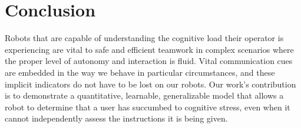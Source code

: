 \documentclass{sig-alternate}
\begin{document}



\section{Conclusion}

Robots that are capable of understanding the cognitive load their operator is experiencing are vital to safe and
efficient teamwork in complex scenarios where the proper level of autonomy and interaction is fluid.  Vital
communication cues are embedded in the way we behave in particular circumstances, and these implicit indicators do not
have to be lost on our robots.  Our work's contribution is to demonstrate a quantitative, learnable, generalizable model
that allows a robot to determine that a user has succumbed to cognitive stress, even when it cannot independently assess
the instructions it is being given.
\end{document}
